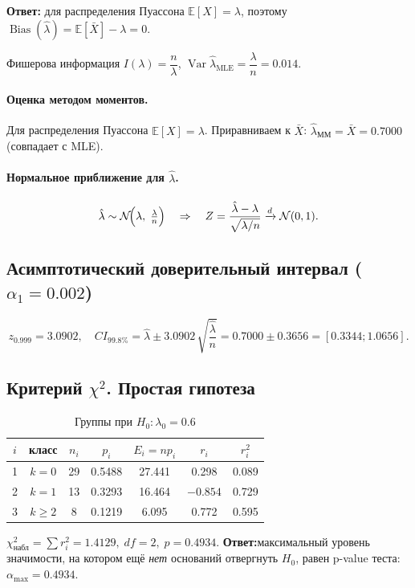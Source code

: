 \documentclass[areasetadvanced]{scrartcl}
\begin{document}
\textbf{Ответ:}
для распределения Пуассона \(\mathbb E[X]=\lambda\), поэтому
\(\operatorname{Bias}(\hat\lambda)=\mathbb E[\bar X]-\lambda=0\).

Фишерова информация \(I(\lambda)=\dfrac{n}{\lambda}\),
\(\operatorname{Var}\hat\lambda_{\text{MLE}}=\dfrac{\lambda}{n}=0.014\).

\paragraph{Оценка методом моментов.}
Для распределения Пуассона
\(\mathbb E[X]=\lambda\). Приравниваем к \(\bar X\):
\(\hat\lambda_{\text{ММ}}=\bar X=0.7000\) (совпадает с MLE).

\paragraph{Нормальное приближение для \(\hat\lambda\).}
\[
\hat\lambda\sim\mathcal N\!\Bigl(\lambda,\;\tfrac{\lambda}{n}\Bigr)
\quad\Rightarrow\quad
Z=\frac{\hat\lambda-\lambda}{\sqrt{\lambda/n}}\xrightarrow{d}\mathcal N(0,1).
\]

\subsection{Асимптотический доверительный интервал (\(\alpha_1=0.002\))}
\[
z_{0.999}=3.0902,\quad
CI_{99.8\%}= \hat\lambda\pm
3.0902\,\sqrt{\frac{\hat\lambda}{n}}
           =0.7000\pm0.3656=[0.3344;1.0656].
\]
\newpage
\subsection{Критерий \(\chi^{2}\). Простая гипотеза}
\begin{longtable}{ccccccc}
\caption{Группы при $H_0:\lambda_0=0.6$}\label{tab:chi1}\\[-1pt]\toprule
$i$ & класс & $n_i$ & $p_i$ & $E_i=np_i$ & $r_i$ & $r_i^2$\\\midrule
1 & $k=0$ & 29 & 0.5488 & 27.441 & 0.298 & 0.089\\
2 & $k=1$ & 13 & 0.3293 & 16.464 & $-0.854$ & 0.729\\
3 & $k\ge2$ & 8 & 0.1219 & 6.095 & 0.772 & 0.595\\
\bottomrule
\end{longtable}
\(\chi^2_{\text{набл}}=\sum r_i^2=1.4129,\;df=2,\;p=0.4934\).
\textbf{Ответ:}\;максимальный уровень значимости,
на котором ещё \emph{нет} оснований отвергнуть \(H_0\),
равен p-value теста:
\(\alpha_{\max}=0.4934.\)
\end{document}
